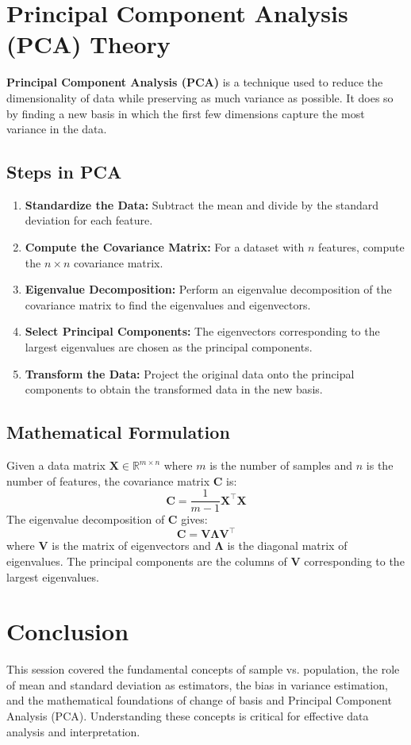 \documentclass[]{article}
\begin{document}
	\section{Principal Component Analysis (PCA) Theory}
	\textbf{Principal Component Analysis (PCA)} is a technique used to reduce the dimensionality of data while preserving as much variance as possible. It does so by finding a new basis in which the first few dimensions capture the most variance in the data.
	
	\subsection{Steps in PCA}
	\begin{enumerate}
		\item \textbf{Standardize the Data:} Subtract the mean and divide by the standard deviation for each feature.
		\item \textbf{Compute the Covariance Matrix:} For a dataset with $n$ features, compute the $n \times n$ covariance matrix.
		\item \textbf{Eigenvalue Decomposition:} Perform an eigenvalue decomposition of the covariance matrix to find the eigenvalues and eigenvectors.
		\item \textbf{Select Principal Components:} The eigenvectors corresponding to the largest eigenvalues are chosen as the principal components.
		\item \textbf{Transform the Data:} Project the original data onto the principal components to obtain the transformed data in the new basis.
	\end{enumerate}
	
	\subsection{Mathematical Formulation}
	Given a data matrix $\mathbf{X} \in \mathbb{R}^{m \times n}$ where $m$ is the number of samples and $n$ is the number of features, the covariance matrix $\mathbf{C}$ is:
	\[
	\mathbf{C} = \frac{1}{m-1} \mathbf{X}^\top \mathbf{X}
	\]
	The eigenvalue decomposition of $\mathbf{C}$ gives:
	\[
	\mathbf{C} = \mathbf{V} \mathbf{\Lambda} \mathbf{V}^\top
	\]
	where $\mathbf{V}$ is the matrix of eigenvectors and $\mathbf{\Lambda}$ is the diagonal matrix of eigenvalues. The principal components are the columns of $\mathbf{V}$ corresponding to the largest eigenvalues.
	
	\section{Conclusion}
	This session covered the fundamental concepts of sample vs. population, the role of mean and standard deviation as estimators, the bias in variance estimation, and the mathematical foundations of change of basis and Principal Component Analysis (PCA). Understanding these concepts is critical for effective data analysis and interpretation.
	
	
	
	
\end{document}
